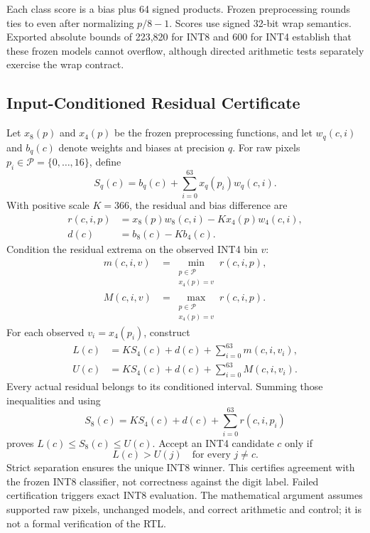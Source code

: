 Each class score is a bias plus 64 signed products. Frozen preprocessing rounds ties to even after normalizing $p/8-1$. Scores use signed 32-bit wrap semantics. Exported absolute bounds of 223,820 for INT8 and 600 for INT4 establish that these frozen models cannot overflow, although directed arithmetic tests separately exercise the wrap contract.

\subsection{Input-Conditioned Residual Certificate}
Let $x_8(p)$ and $x_4(p)$ be the frozen preprocessing functions, and let $w_q(c,i)$ and $b_q(c)$ denote weights and biases at precision $q$. For raw pixels $p_i\in\mathcal{P}=\{0,\ldots,16\}$, define
\begin{equation}
S_q(c)=b_q(c)+\sum_{i=0}^{63}x_q(p_i)w_q(c,i).
\end{equation}
With positive scale $K=366$, the residual and bias difference are
\begin{align}
r(c,i,p)&=x_8(p)w_8(c,i)-Kx_4(p)w_4(c,i),\\
d(c)&=b_8(c)-Kb_4(c).
\end{align}
Condition the residual extrema on the observed INT4 bin $v$:
\begin{align}
m(c,i,v)&=\min_{\substack{p\in\mathcal{P}\\x_4(p)=v}}r(c,i,p),\\
M(c,i,v)&=\max_{\substack{p\in\mathcal{P}\\x_4(p)=v}}r(c,i,p).
\end{align}
For each observed $v_i=x_4(p_i)$, construct
\begin{align}
L(c)&=KS_4(c)+d(c)+\sum_{i=0}^{63}m(c,i,v_i),\\
U(c)&=KS_4(c)+d(c)+\sum_{i=0}^{63}M(c,i,v_i).
\end{align}
Every actual residual belongs to its conditioned interval. Summing those inequalities and using
\begin{equation}
S_8(c)=KS_4(c)+d(c)+\sum_{i=0}^{63}r(c,i,p_i)
\end{equation}
proves $L(c)\leq S_8(c)\leq U(c)$. Accept an INT4 candidate $c$ only if
\begin{equation}
L(c)>U(j)\quad\text{for every }j\ne c.
\label{eq:accept}
\end{equation}
Strict separation ensures the unique INT8 winner. This certifies agreement with the frozen INT8 classifier, not correctness against the digit label. Failed certification triggers exact INT8 evaluation. The mathematical argument assumes supported raw pixels, unchanged models, and correct arithmetic and control; it is not a formal verification of the RTL.

